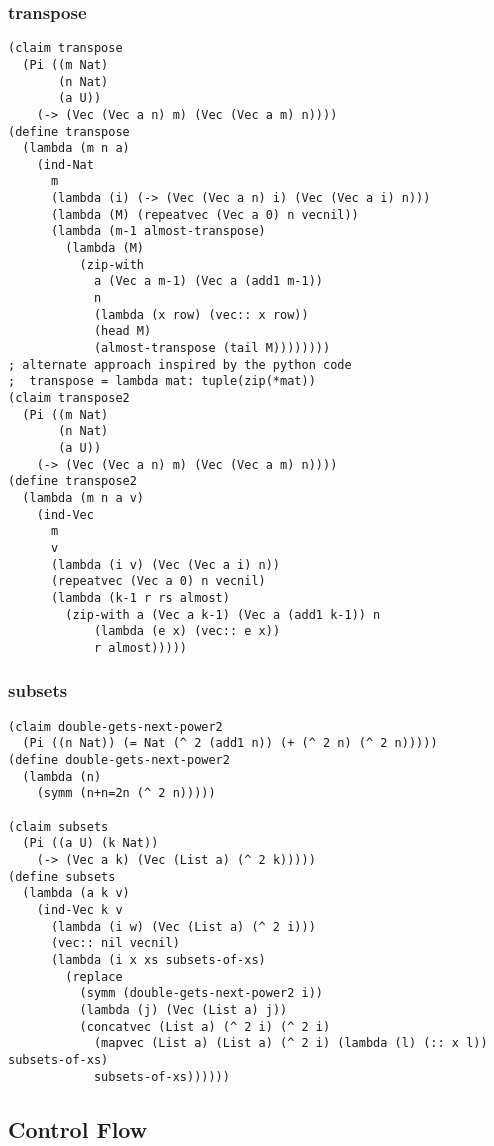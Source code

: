 \subsubsection{transpose} \label{code:transpose}
\begin{verbatim}
(claim transpose
  (Pi ((m Nat)
       (n Nat)
       (a U))
    (-> (Vec (Vec a n) m) (Vec (Vec a m) n))))
(define transpose
  (lambda (m n a)
    (ind-Nat
      m
      (lambda (i) (-> (Vec (Vec a n) i) (Vec (Vec a i) n)))
      (lambda (M) (repeatvec (Vec a 0) n vecnil))
      (lambda (m-1 almost-transpose)
        (lambda (M)
          (zip-with
            a (Vec a m-1) (Vec a (add1 m-1))
            n
            (lambda (x row) (vec:: x row))
            (head M)
            (almost-transpose (tail M))))))))
; alternate approach inspired by the python code
;  transpose = lambda mat: tuple(zip(*mat))
(claim transpose2
  (Pi ((m Nat)
       (n Nat)
       (a U))
    (-> (Vec (Vec a n) m) (Vec (Vec a m) n))))
(define transpose2
  (lambda (m n a v)
    (ind-Vec
      m
      v
      (lambda (i v) (Vec (Vec a i) n))
      (repeatvec (Vec a 0) n vecnil)
      (lambda (k-1 r rs almost)
        (zip-with a (Vec a k-1) (Vec a (add1 k-1)) n 
            (lambda (e x) (vec:: e x)) 
            r almost)))))
\end{verbatim}

\subsubsection{subsets} \label{code:subsets}
\begin{verbatim}
(claim double-gets-next-power2
  (Pi ((n Nat)) (= Nat (^ 2 (add1 n)) (+ (^ 2 n) (^ 2 n)))))
(define double-gets-next-power2
  (lambda (n)
    (symm (n+n=2n (^ 2 n)))))

(claim subsets
  (Pi ((a U) (k Nat))
    (-> (Vec a k) (Vec (List a) (^ 2 k)))))
(define subsets
  (lambda (a k v)
    (ind-Vec k v
      (lambda (i w) (Vec (List a) (^ 2 i)))
      (vec:: nil vecnil)
      (lambda (i x xs subsets-of-xs)
        (replace
          (symm (double-gets-next-power2 i))
          (lambda (j) (Vec (List a) j))
          (concatvec (List a) (^ 2 i) (^ 2 i)
            (mapvec (List a) (List a) (^ 2 i) (lambda (l) (:: x l)) subsets-of-xs)
            subsets-of-xs))))))
\end{verbatim}



\subsection{Control Flow}

